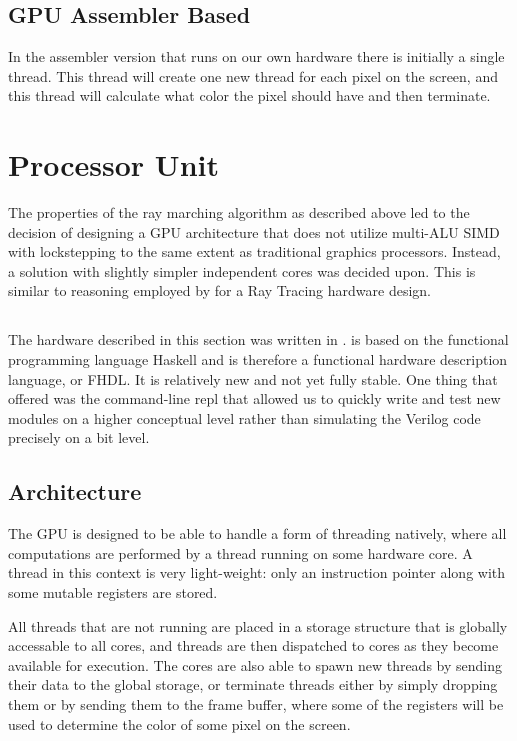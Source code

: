 		\subsection{GPU Assembler Based}

			In the assembler version that runs on our own hardware there is
			initially a single thread. This thread will create one new thread
			for each pixel on the screen, and this thread will calculate what 
			color the pixel should have and then terminate. 


	\section{Processor Unit} \label{implproc}

		The properties of the ray marching algorithm as described above led to
		the decision of designing a GPU architecture that does not utilize
		multi-ALU SIMD with lockstepping to the same extent as traditional
		graphics processors. Instead, a solution with slightly simpler
		independent cores was decided upon. This is similar to reasoning
		employed by \cite{Woop2005} for a Ray Tracing hardware design.

		\subsection{\clash}

			The hardware described in this section was written in \clash. \clash is
			based on the functional programming language Haskell and is therefore a
			functional hardware description language, or FHDL. It is relatively new
			and not yet fully stable. One thing that \clash offered was the
			command-line repl that allowed us to quickly write and test new modules
			on a higher conceptual level rather than simulating the Verilog code
			precisely on a bit level.

		\subsection{Architecture}

			The GPU is designed to be able to handle a form of threading
			natively, where all computations are performed by a thread running
			on some hardware core. A thread in this context is very
			light-weight: only an instruction pointer along with some mutable
			registers are stored.

			All threads that are not running are placed in a storage structure
			that is globally accessable to all cores, and threads are then 
			dispatched to cores as they become available for execution. The 
			cores are also able to spawn new threads by sending their data to
			the global storage, or terminate threads either by simply dropping 
			them or by sending them to the frame buffer, where some of the 
			registers will be used to determine the color of some pixel on the
			screen.

